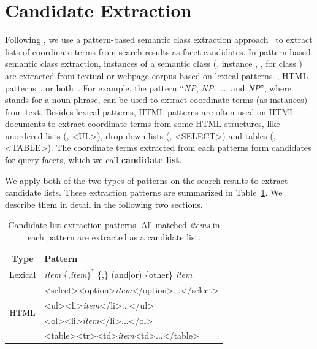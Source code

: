 \section{Candidate Extraction}
\label{sec:facet-candidate}
Following \citet{dou2011finding}, we use a pattern-based semantic class extraction approach~\cite{shi2010corpus} to extract lists of coordinate terms from search results as facet candidates. In pattern-based semantic class extraction, instances of a semantic class (\eg, instance , ,  for class ) are extracted from textual or webpage corpus based on lexical patterns~\cite{hearst1992automatic,pasca2004acquisition}, HTML patterns~\cite{shinzato2005simple}, or both~\cite{shi2008pattern,zhang2009employing}. For example, the pattern ``\textit{NP}, \textit{NP}, ..., and \textit{NP}'', where  stands for a noun phrase, can be used to extract coordinate terms (as instances) from text. Besides lexical patterns, HTML patterns are often used on HTML documents to extract coordinate terms from some HTML structures, like unordered lists (\ie, <UL>), drop-down lists (\ie, <SELECT>) and 
tables (\ie, <TABLE>). The coordinate terms extracted from each patterns form candidates for query facets, which we call \textbf{candidate list}.

We apply both of the two types of patterns on the search results to extract candidate lists. These extraction patterns are summarized in Table~\ref{tab:facet-patterns}. We describe them in detail in the following two sections.

\begin{table}[!ht]
\centering
\caption{Candidate list extraction patterns. All matched \textit{items} in each pattern are extracted as a candidate list.}
\label{tab:facet-patterns}
\begin{tabular}{|c|l|} \hline
Type& Pattern\\ \hline
Lexical & \textit{item} \{,\textit{item}$\}^*$ \{,\} (and|or) \{other\} \textit{item}  \\  \hline
\multirow{4}{*}{HTML}
& <select><option>\textit{item}</option>...</select>\\\cline{2-2}
& <ul><li>\textit{item}</li>...</ul>\\\cline{2-2}
& <ol><li>\textit{item}</li>...</ol>\\\cline{2-2}
& <table><tr><td>\textit{item}<td>...</table>\\ \hline
\end{tabular}
\end{table}

